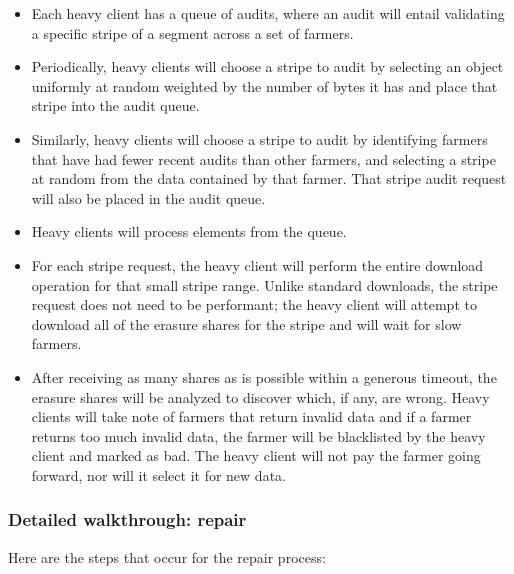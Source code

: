 \documentclass[a4paper,10pt]{article} \usepackage[utf8]{inputenc}
\begin{document}
\begin{itemize}
\item Each heavy client has a queue of audits, where an audit will entail
  validating a specific stripe of a segment across a set of farmers.
\item Periodically, heavy clients will choose a stripe to audit by selecting
  an object uniformly at random weighted by the number of bytes it has and place
  that stripe into the audit queue.
\item Similarly, heavy clients will choose a stripe to audit by identifying
  farmers that have had fewer recent audits than other farmers, and selecting
  a stripe at random from the data contained by that farmer. That stripe audit
  request will also be placed in the audit queue.
\item Heavy clients will process elements from the queue.
\item For each stripe request, the heavy client will perform the entire download
  operation for that small stripe range. Unlike standard downloads, the stripe
  request does not need to be performant; the heavy client will attempt to
  download all of the erasure shares for the stripe and will wait for slow
  farmers.
\item After receiving as many shares as is possible within a generous timeout,
  the erasure shares will be analyzed to discover which, if any, are wrong.
  Heavy clients will take note of farmers that return invalid data and if a
  farmer returns too much invalid data, the farmer will be blacklisted by the
  heavy client and marked as bad. The heavy client will not pay the farmer going
  forward, nor will it select it for new data.
\end{itemize}

\subsubsection{Detailed walkthrough: repair}

Here are the steps that occur for the repair process: 
\end{document}
